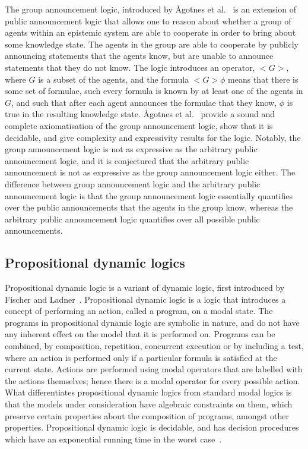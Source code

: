 The group announcement logic, introduced by {\AA}gotnes et
al.~\cite{agotnes2010group} is an extension of public announcement logic that
allows one to reason about whether a group of agents within an epistemic system
are able to cooperate in order to bring about some knowledge state. The agents
in the group are able to cooperate by publicly announcing statements that the
agents know, but are unable to announce statements that they do not know. The
logic introduces an operator, $<G>$, where $G$ is a subset of the agents, and
the formula $<G> \phi$ means that there is some set of formulae, such every
formula is known by at least one of the agents in $G$, and such that after each
agent announces the formulae that they know, $\phi$ is true in the resulting
knowledge state. {\AA}gotnes et al.~\cite{agotnes2010group} provide a sound and
complete axiomatisation of the group announcement logic, show that it is
decidable, and give complexity and expressivity results for the logic. Notably,
the group announcement logic is not as expressive as the arbitrary public
announcement logic, and it is conjectured that the arbitrary public announcement
is not as expressive as the group announcement logic either.  The difference
between group announcement logic and the arbitrary public announcement logic is
that the group announcement logic essentially quantifies over the public
announcements that the agents in the group know, whereas the arbitrary public
announcement logic quantifies over all possible public announcements.

\subsection{Propositional dynamic logics}

Propositional dynamic logic is a variant of dynamic logic, first introduced by
Fischer and Ladner~\cite{fischer1979propositional}. Propositional dynamic logic
is a logic that introduces a concept of performing an action, called a program,
on a modal state. The programs in propositional dynamic logic are symbolic in
nature, and do not have any inherent effect on the model that it is performed
on. Programs can be combined, by composition, repetition, concurrent execution
or by including a test, where an action is performed only if a particular
formula is satisfied at the current state. Actions are performed using modal
operators that are labelled with the actions themselves; hence there is a modal
operator for every possible action. What differentiates propositional dynamic
logics from standard modal logics is that the models under consideration have
algebraic constraints on them, which preserve certain properties about the
composition of programs, amongst other properties. Propositional dynamic logic
is decidable, and has decision procedures which have an exponential running time
in the worst case~\cite{pratt1980near}.

